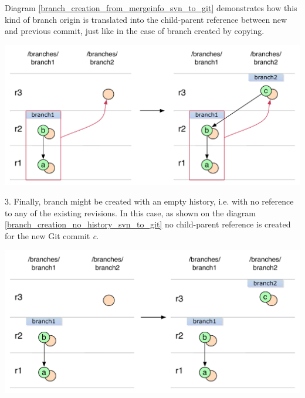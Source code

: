 \\\\
Diagram \ref{branch_creation_from_mergeinfo_svn_to_git} demonstrates how this kind of branch origin 
is translated into the child-parent reference between new and previous commit, just like in the 
case of branch created by copying.
\begin{center}
\includegraphics[width=\textwidth]{img/diagrams/branch_creation_from_mergeinfo_svn_to_git.pdf}%
\label{branch_creation_from_mergeinfo_svn_to_git}%
\end{center}

3. Finally, branch might be created with an empty history, i.e. with no reference to any of the existing 
revisions. In this case, as shown on the diagram \ref{branch_creation_no_history_svn_to_git} no child-parent
reference is created for the new Git commit \emph{c}. 

\begin{center}
\includegraphics[width=\textwidth]{img/diagrams/branch_creation_no_history_svn_to_git.pdf}%
\label{branch_creation_no_history_svn_to_git}%
\end{center}

